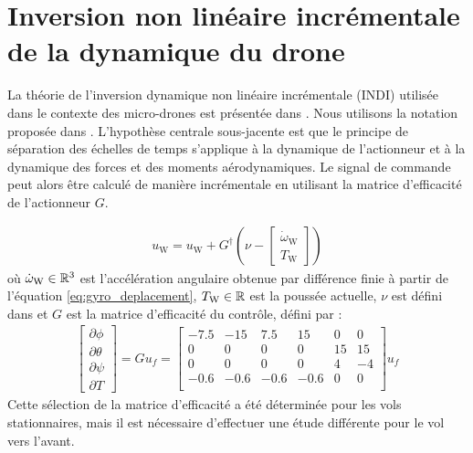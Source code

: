 \section{Inversion non linéaire incrémentale de la dynamique du drone}

La théorie de l'inversion dynamique non linéaire incrémentale (INDI) utilisée dans le contexte des micro-drones est présentée dans \cite{smeurINDI}. Nous utilisons la notation proposée dans \cite{smeurINDITail}. L'hypothèse centrale sous-jacente est que le principe de séparation des échelles de temps s'applique à la dynamique de l'actionneur et à la dynamique des forces et des moments aérodynamiques. Le signal de commande peut alors être calculé de manière incrémentale en utilisant la matrice d'efficacité de l'actionneur $G$.

\begin{align}
    u_{\text{W}} = u_{\text{W}} + G^{\dag} (\nu - \begin{bmatrix}
    \dot{\omega}_{\text{W}} \\
    T_{\text{W}}
    \end{bmatrix})
\end{align}
où  $ \dot{\omega}_{\text{W}} \in {\mathbb R}^{3}$ est l'accélération angulaire obtenue par différence finie à partir de l'équation \eqref{eq:gyro_deplacement},  $T_{\text{W}} \in {\mathbb R}$ est la poussée actuelle, $\nu$ est défini dans \cite[équation (4)]{smeurINDITail} et $G$ est la matrice d'efficacité du contrôle, défini par :
\begin{align*}
    \begin{bmatrix}
    \partial \phi \\
    \partial \theta \\
    \partial \psi \\
    \partial T
    \end{bmatrix}\! =\! G u_{f} \!=\!
    \begin{bmatrix}
    -7.5 & -15 & 7.5 & 15 & 0 & 0\\
    0 & 0 & 0 & 0 & 15 & 15 \\
    0 & 0 & 0 & 0 & 4 & -4 \\
    -0.6 & -0.6 & -0.6 & -0.6 & 0 & 0\\
    \end{bmatrix}
    u_{f}
\end{align*}
Cette sélection de la matrice d'efficacité a été déterminée pour les vols stationnaires, mais il est nécessaire d'effectuer une étude différente pour le vol vers l'avant.

